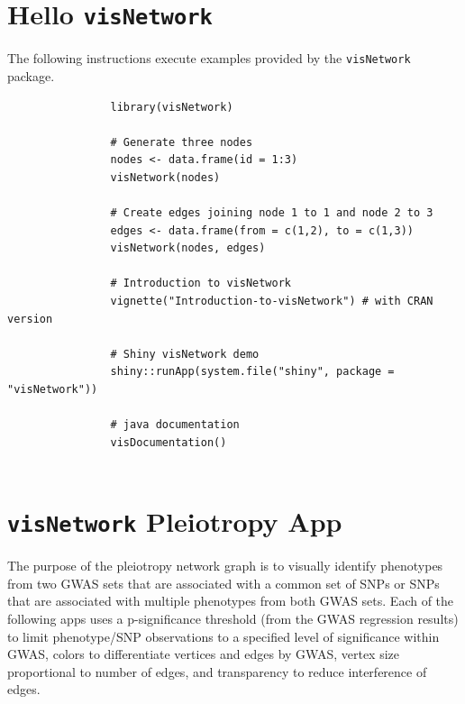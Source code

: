 \documentclass[10pt, letterpaper]{article}
\begin{document}
\begin{spacing}{1.0}

\section{Hello \texttt{visNetwork}}\label{sec:helloVisNetwork}

The following instructions execute examples provided by the \texttt{visNetwork} package.\\

\small
\begin{verbatim}
                library(visNetwork)
                
                # Generate three nodes
                nodes <- data.frame(id = 1:3)
                visNetwork(nodes)
                
                # Create edges joining node 1 to 1 and node 2 to 3
                edges <- data.frame(from = c(1,2), to = c(1,3))
                visNetwork(nodes, edges)
                
                # Introduction to visNetwork
                vignette("Introduction-to-visNetwork") # with CRAN version
                
                # Shiny visNetwork demo
                shiny::runApp(system.file("shiny", package = "visNetwork"))
                
                # java documentation
                visDocumentation()
                
\end{verbatim}
\normalsize


\section{\texttt{visNetwork} Pleiotropy App}\label{sec:visNetwork}

The purpose of the pleiotropy network graph is to visually identify phenotypes from two GWAS sets that are associated with a common set of SNPs or SNPs that are associated with multiple phenotypes from both GWAS sets.  Each of the following apps uses a p-significance threshold (from the GWAS regression results) to limit phenotype/SNP observations to a specified level of significance within GWAS, colors to differentiate vertices and edges by GWAS, vertex size proportional to number of edges, and transparency to reduce interference of edges.  


\end{spacing}
\end{document}
